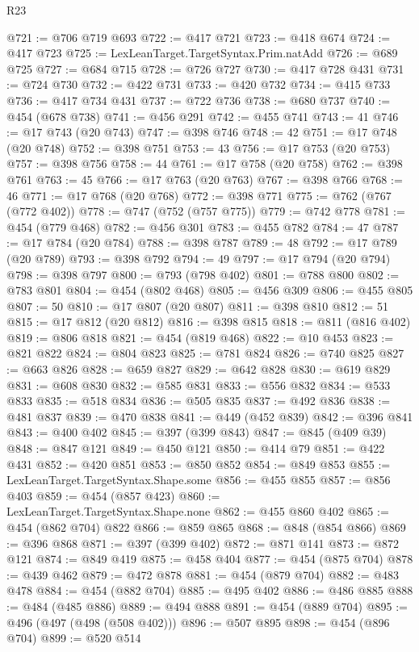 \begin{lexlean}{R23}
\begin{coremodule}
@721 := @706 @719 @693
@722 := @417 @721
@723 := @418 @674
@724 := @417 @723
@725 := LexLeanTarget.TargetSyntax.Prim.natAdd
@726 := @689 @725
@727 := @684 @715
@728 := @726 @727
@730 := @417 @728 @431
@731 := @724 @730
@732 := @422 @731
@733 := @420 @732
@734 := @415 @733
@736 := @417 @734 @431
@737 := @722 @736
@738 := @680 @737
@740 := @454 (@678 @738)
@741 := @456 @291
@742 := @455 @741
@743 := 41
@746 := @17 @743 (@20 @743)
@747 := @398 @746
@748 := 42
@751 := @17 @748 (@20 @748)
@752 := @398 @751
@753 := 43
@756 := @17 @753 (@20 @753)
@757 := @398 @756
@758 := 44
@761 := @17 @758 (@20 @758)
@762 := @398 @761
@763 := 45
@766 := @17 @763 (@20 @763)
@767 := @398 @766
@768 := 46
@771 := @17 @768 (@20 @768)
@772 := @398 @771
@775 := @762 (@767 (@772 @402))
@778 := @747 (@752 (@757 @775))
@779 := @742 @778
@781 := @454 (@779 @468)
@782 := @456 @301
@783 := @455 @782
@784 := 47
@787 := @17 @784 (@20 @784)
@788 := @398 @787
@789 := 48
@792 := @17 @789 (@20 @789)
@793 := @398 @792
@794 := 49
@797 := @17 @794 (@20 @794)
@798 := @398 @797
@800 := @793 (@798 @402)
@801 := @788 @800
@802 := @783 @801
@804 := @454 (@802 @468)
@805 := @456 @309
@806 := @455 @805
@807 := 50
@810 := @17 @807 (@20 @807)
@811 := @398 @810
@812 := 51
@815 := @17 @812 (@20 @812)
@816 := @398 @815
@818 := @811 (@816 @402)
@819 := @806 @818
@821 := @454 (@819 @468)
@822 := @10 @453
@823 := @821 @822
@824 := @804 @823
@825 := @781 @824
@826 := @740 @825
@827 := @663 @826
@828 := @659 @827
@829 := @642 @828
@830 := @619 @829
@831 := @608 @830
@832 := @585 @831
@833 := @556 @832
@834 := @533 @833
@835 := @518 @834
@836 := @505 @835
@837 := @492 @836
@838 := @481 @837
@839 := @470 @838
@841 := @449 (@452 @839)
@842 := @396 @841
@843 := @400 @402
@845 := @397 (@399 @843)
@847 := @845 (@409 @39)
@848 := @847 @121
@849 := @450 @121
@850 := @414 @79
@851 := @422 @431
@852 := @420 @851
@853 := @850 @852
@854 := @849 @853
@855 := LexLeanTarget.TargetSyntax.Shape.some
@856 := @455 @855
@857 := @856 @403
@859 := @454 (@857 @423)
@860 := LexLeanTarget.TargetSyntax.Shape.none
@862 := @455 @860 @402
@865 := @454 (@862 @704) @822
@866 := @859 @865
@868 := @848 (@854 @866)
@869 := @396 @868
@871 := @397 (@399 @402)
@872 := @871 @141
@873 := @872 @121
@874 := @849 @419
@875 := @458 @404
@877 := @454 (@875 @704)
@878 := @439 @462
@879 := @472 @878
@881 := @454 (@879 @704)
@882 := @483 @478
@884 := @454 (@882 @704)
@885 := @495 @402
@886 := @486 @885
@888 := @484 (@485 @886)
@889 := @494 @888
@891 := @454 (@889 @704)
@895 := @496 (@497 (@498 (@508 @402)))
@896 := @507 @895
@898 := @454 (@896 @704)
@899 := @520 @514

\end{coremodule}
\end{lexlean}
